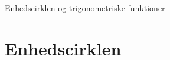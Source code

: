 \documentclass[12pt]{article}
\begin{document}




\begin{center}
\Huge
Enhedscirklen og trigonometriske funktioner
\end{center}

\section*{Enhedscirklen}
\end{document}
